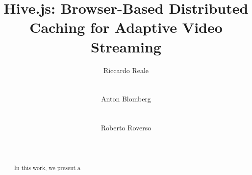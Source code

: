 \documentclass{sig-alternate}
\begin{document}


\title{Hive.js: Browser-Based Distributed Caching for Adaptive Video Streaming}


\author{
\alignauthor
Riccardo Reale\\
      \\
      \\
\alignauthor
Anton Blomberg\\
      \\
      \\
\alignauthor
Roberto Roverso\\
      \\
      \\
}

\newcommand{\mysec}[1]{\vspace*{-0.0cm}\section{#1}}
\newcommand{\mysubsec}[1]{\vspace*{-0.0cm}\subsection{#1}\vspace*{0cm}}
\newcommand{\mysubsubsec}[1]{\vspace*{-0.0cm}\subsubsection{#1}\vspace*{0cm}}
\newcommand{\mypar}[1]{\vspace*{-0cm}\paragraph{#1}\vspace*{0cm}}

\maketitle

\begin{abstract}

In this work, we present a

\end{abstract}
\end{document}
